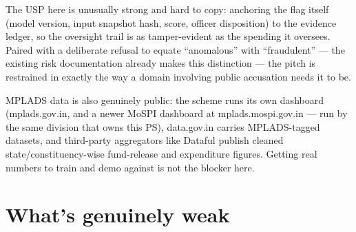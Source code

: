 \documentclass[11pt]{article}
\begin{document}
The USP here is unusually strong and hard to copy: anchoring the flag itself (model version, input snapshot
hash, score, officer disposition) to the evidence ledger, so the oversight trail is as tamper-evident as the
spending it oversees. Paired with a deliberate refusal to equate ``anomalous'' with ``fraudulent'' --- the
existing risk documentation already makes this distinction --- the pitch is restrained in exactly the way a
domain involving public accusation needs it to be.

MPLADS data is also genuinely public: the scheme runs its own dashboard (mplads.gov.in, and a newer MoSPI
dashboard at mplads.mospi.gov.in --- run by the same division that owns this PS), data.gov.in carries
MPLADS-tagged datasets, and third-party aggregators like Dataful publish cleaned state/constituency-wise
fund-release and expenditure figures. Getting real numbers to train and demo against is not the blocker
here.

\clearpage
\section{What's genuinely weak}
\end{document}
